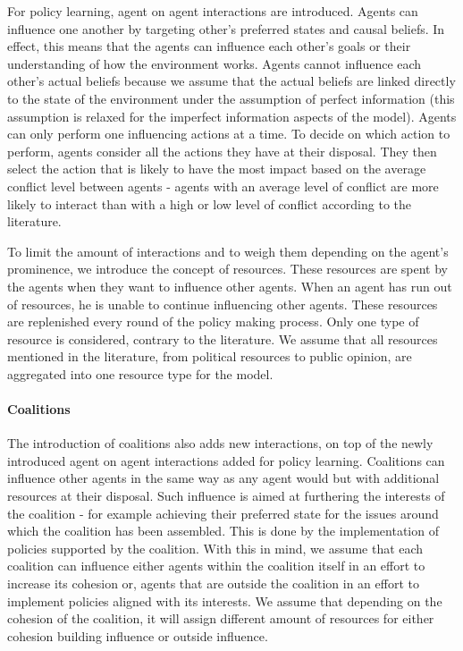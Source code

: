 \documentclass[11pt]{article}
\begin{document}
For policy learning, agent on agent interactions are introduced. Agents can influence one another by targeting other's preferred states and causal beliefs. In effect, this means that the agents can influence each other's goals or their understanding of how the environment works. Agents cannot influence each other's actual beliefs because we assume that the actual beliefs are linked directly to the state of the environment under the assumption of perfect information (this assumption is relaxed for the imperfect information aspects of the model). Agents can only perform one influencing actions at a time. To decide on which action to perform, agents consider all the actions they have at their disposal. They then select the action that is likely to have the most impact based on the average conflict level between agents - agents with an average level of conflict are more likely to interact than with a high or low level of conflict according to the literature.

To limit the amount of interactions and to weigh them depending on the agent's prominence, we introduce the concept of resources. These resources are spent by the agents when they want to influence other agents. When an agent has run out of resources, he is unable to continue influencing other agents. These resources are replenished every round of the policy making process. Only one type of resource is considered, contrary to the literature. We assume that all resources mentioned in the literature, from political resources to public opinion, are aggregated into one resource type for the model.

\paragraph{Coalitions}

The introduction of coalitions also adds new interactions, on top of the newly introduced agent on agent interactions added for policy learning. Coalitions can influence other agents in the same way as any agent would but with additional resources at their disposal. Such influence is aimed at furthering the interests of the coalition - for example achieving their preferred state for the issues around which the coalition has been assembled. This is done by the implementation of policies supported by the coalition. With this in mind, we assume that each coalition can influence either agents within the coalition itself in an effort to increase its cohesion or, agents that are outside the coalition in an effort to implement policies aligned with its interests. We assume that depending on the cohesion of the coalition, it will assign different amount of resources for either cohesion building influence or outside influence. 
\end{document}

